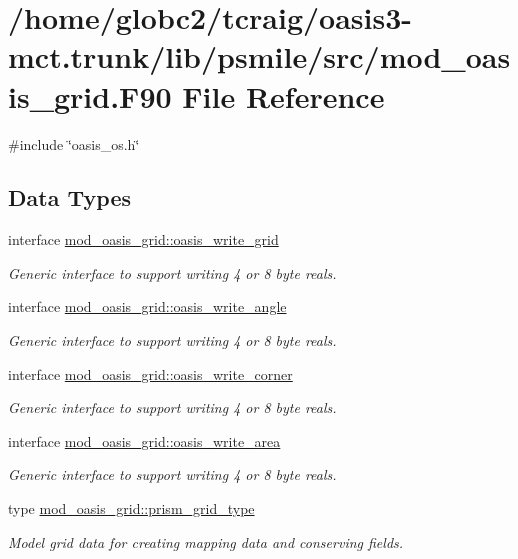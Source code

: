 \hypertarget{mod__oasis__grid_8_f90}{}\section{/home/globc2/tcraig/oasis3-\/mct.trunk/lib/psmile/src/mod\+\_\+oasis\+\_\+grid.F90 File Reference}
\label{mod__oasis__grid_8_f90}
{\ttfamily \#include \char`\"{}oasis\+\_\+os.\+h\char`\"{}}\newline
\subsection*{Data Types}
\begin{DoxyCompactItemize}
\item 
interface \hyperlink{interfacemod__oasis__grid_1_1oasis__write__grid}{mod\+\_\+oasis\+\_\+grid\+::oasis\+\_\+write\+\_\+grid}
\begin{DoxyCompactList}\small\item\em Generic interface to support writing 4 or 8 byte reals. \end{DoxyCompactList}\item 
interface \hyperlink{interfacemod__oasis__grid_1_1oasis__write__angle}{mod\+\_\+oasis\+\_\+grid\+::oasis\+\_\+write\+\_\+angle}
\begin{DoxyCompactList}\small\item\em Generic interface to support writing 4 or 8 byte reals. \end{DoxyCompactList}\item 
interface \hyperlink{interfacemod__oasis__grid_1_1oasis__write__corner}{mod\+\_\+oasis\+\_\+grid\+::oasis\+\_\+write\+\_\+corner}
\begin{DoxyCompactList}\small\item\em Generic interface to support writing 4 or 8 byte reals. \end{DoxyCompactList}\item 
interface \hyperlink{interfacemod__oasis__grid_1_1oasis__write__area}{mod\+\_\+oasis\+\_\+grid\+::oasis\+\_\+write\+\_\+area}
\begin{DoxyCompactList}\small\item\em Generic interface to support writing 4 or 8 byte reals. \end{DoxyCompactList}\item 
type \hyperlink{structmod__oasis__grid_1_1prism__grid__type}{mod\+\_\+oasis\+\_\+grid\+::prism\+\_\+grid\+\_\+type}
\begin{DoxyCompactList}\small\item\em Model grid data for creating mapping data and conserving fields. \end{DoxyCompactList}\end{DoxyCompactItemize}
